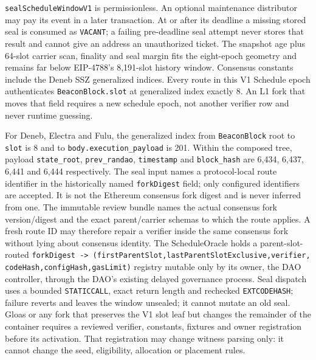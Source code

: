 \documentclass[a4paper,11pt]{article}
\newcommand{\code}[1]{\nolinkurl{#1}}
\begin{document}
\code{sealScheduleWindowV1} is permissionless.  An optional maintenance distributor may
pay its event in a later transaction.  At or after its deadline a missing
stored seal is consumed as \code{VACANT}; a failing pre-deadline seal attempt
never stores that result and cannot give an address an unauthorized ticket.  The snapshot
age plus 64-slot carrier scan, finality and seal margin fits the eight-epoch
geometry and remains far below EIP-4788's 8,191-slot history window.  Consensus
constants include the Deneb SSZ generalized indices.  Every route in this V1
Schedule epoch authenticates \code{BeaconBlock.slot} at generalized index
exactly 8.  An L1 fork that moves that field requires a new schedule epoch,
not another verifier row and never runtime guessing.

For Deneb, Electra and Fulu, the generalized index from \code{BeaconBlock} root
to \code{slot} is 8 and to \code{body.execution_payload} is 201.  Within the
composed tree, payload \code{state_root}, \code{prev_randao}, \code{timestamp}
and \code{block_hash} are 6,434, 6,437, 6,441 and 6,444 respectively.  The seal
input names a protocol-local route identifier in the historically named
\code{forkDigest} field; only configured identifiers are accepted.  It is not
the Ethereum consensus fork digest and is never inferred from one.  The
immutable review bundle names the actual consensus fork version/digest and
the exact parent/carrier schemas to which the route applies.  A fresh route ID
may therefore repair a verifier inside the same consensus fork without lying
about consensus identity.
The ScheduleOracle holds a parent-slot-routed
\code{forkDigest -> (firstParentSlot,lastParentSlotExclusive,verifier,
codeHash,configHash,gasLimit)} registry mutable only by its owner, the DAO
controller, through the DAO's existing delayed governance process.  Seal
dispatch uses a bounded \code{STATICCALL}, exact return length and rechecked
\code{EXTCODEHASH}; failure reverts and leaves the window unsealed; it cannot
mutate an old seal.  Gloas or any fork that preserves the V1 slot leaf but
changes the remainder of the container requires a reviewed verifier,
constants, fixtures and owner registration before its activation.  That
registration may change witness parsing only: it cannot change the seed,
eligibility, allocation or placement rules.
\end{document}
